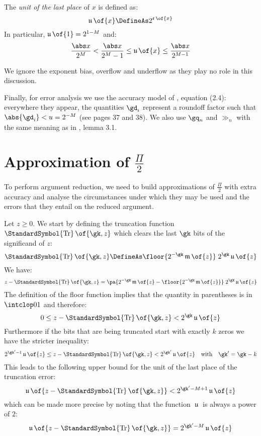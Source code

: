 \documentclass[10pt, a4paper, twoside]{basestyle}
\DeclareMathOperator{\ULP}{\mathfrak u}
\DeclareMathOperator{\mant}{\mathfrak m}
\DeclareMathOperator{\expn}{\mathfrak e}
\DeclareMathOperator{\truncate}{\StandardSymbol{Tr}}
\begin{document}
The \emph{unit of the last place} of $x$ is defined as:
\[
\ULP\of{x} \DefineAs 2^{\expn\of{x}}
\]
In particular, $\ULP\of{1} = 2^{1 - M}$ and:
\begin{equation}
\frac{\abs x}{2^M} < \frac{\abs x}{2^M - 1} \leq \ULP\of{x} \leq \frac{\abs x}{2^{M - 1}}
\label{eqnulp}
\end{equation}

We ignore the exponent bias, overflow and underflow as they play no role in this discussion.

Finally, for error analysis we use the accuracy model of \cite{Higham2002}, equation (2.4): everywhere they appear, the quantities $\gd_i$ represent a roundoff factor such that $\abs{\gd_i} < u = 2^{-M}$ (see pages 37 and 38).  We also use $\gq_n$ and $\gg_n$ with the same meaning as in \cite{Higham2002}, lemma 3.1.

\section*{Approximation of $\frac{\Pi}{2}$}
To perform argument reduction, we need to build approximations of $\frac{\Pi}{2}$ with extra accuracy and analyse the circumstances under which they may be used and the errors that they entail on the reduced argument.

Let $z \geq 0$.  We start by defining the truncation function $\truncate\of{\gk, z}$ which clears the last $\gk$ bits of the significand of $z$:
\[
\truncate\of{\gk, z} \DefineAs \floor{2^{-\gk} \mant \of{z}} \; 2^{\gk} \ULP\of{z}
\]
We have:
\[
z - \truncate\of{\gk, z} = \pa{2^{-\gk} \mant \of{z} - \floor{2^{-\gk} \mant \of{z}}} \; 2^{\gk} \ULP\of{z}
\]
The definition of the floor function implies that the quantity in parentheses is in $\intclop 0 1$ and therefore:
\[
0 \leq z - \truncate\of{\gk, z} < 2^{\gk} \ULP\of{z}
\]
Furthermore if the bits that are being truncated start with exactly $k$ zeros we have the stricter inequality:
\begin{equation}
2^{\gk' - 1} \ULP\of{z} \leq z - \truncate\of{\gk, z} < 2^{\gk'} \ULP\of{z} \quad \text{with} \quad \gk' = \gk - k
\label{eqntruncerror}
\end{equation}
This leads to the following upper bound for the unit of the last place of the truncation error:
\[
\ULP\of{z - \truncate\of{\gk, z}} < 2^{\gk' - M + 1} \ULP\of{z}
\]
which can be made more precise by noting that the function $\ULP$ is always a power of $2$:
\begin{equation}
\ULP\of{z - \truncate\of{\gk, z}} = 2^{\gk' - M} \ULP\of{z}
\label{eqnulptr}
\end{equation}
\end{document}
